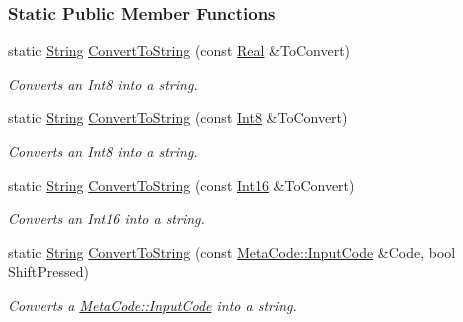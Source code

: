 \subsubsection*{Static Public Member Functions}
\begin{DoxyCompactItemize}
\item 
static \hyperlink{namespaceMezzanine_acf9fcc130e6ebf08e3d8491aebcf1c86}{String} \hyperlink{classMezzanine_1_1StringTool_a87c96f44624cff22342f79ca9667330c}{ConvertToString} (const \hyperlink{namespaceMezzanine_a726731b1a7df72bf3583e4a97282c6f6}{Real} \&ToConvert)
\begin{DoxyCompactList}\small\item\em Converts an Int8 into a string. \item\end{DoxyCompactList}\item 
static \hyperlink{namespaceMezzanine_acf9fcc130e6ebf08e3d8491aebcf1c86}{String} \hyperlink{classMezzanine_1_1StringTool_a46fbc1d0337193ab7cd8b2fddba0028c}{ConvertToString} (const \hyperlink{namespaceMezzanine_acbb048ee99aa07566d5a6eb33f5a2c2d}{Int8} \&ToConvert)
\begin{DoxyCompactList}\small\item\em Converts an Int8 into a string. \item\end{DoxyCompactList}\item 
static \hyperlink{namespaceMezzanine_acf9fcc130e6ebf08e3d8491aebcf1c86}{String} \hyperlink{classMezzanine_1_1StringTool_a87b8d888f2ab2ec5a07e6bbfe37c2f6a}{ConvertToString} (const \hyperlink{namespaceMezzanine_adb602bffcbc8f1b381b2f529e9e364f6}{Int16} \&ToConvert)
\begin{DoxyCompactList}\small\item\em Converts an Int16 into a string. \item\end{DoxyCompactList}\item 
static \hyperlink{namespaceMezzanine_acf9fcc130e6ebf08e3d8491aebcf1c86}{String} \hyperlink{classMezzanine_1_1StringTool_a6c6ae7843b5ab368f997ed400c9a9aa5}{ConvertToString} (const \hyperlink{classMezzanine_1_1MetaCode_a3b5633f0145bf3287cf53a3f05b5563c}{MetaCode::InputCode} \&Code, bool ShiftPressed)
\begin{DoxyCompactList}\small\item\em Converts a \hyperlink{classMezzanine_1_1MetaCode_a3b5633f0145bf3287cf53a3f05b5563c}{MetaCode::InputCode} into a string. \item\end{DoxyCompactList}\item 

\end{DoxyCompactItemize}
